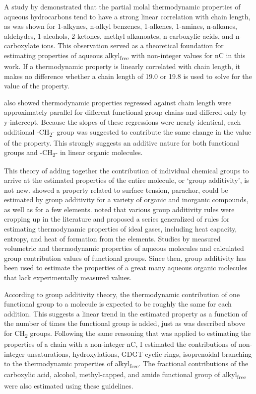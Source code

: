 A study by \cite{shock1990calculation} demonstrated that the partial molal thermodynamic properties of aqueous hydrocarbons tend to have a strong linear correlation with chain length, as was shown for 1-alkynes, n-alkyl benzenes, 1-alkenes, 1-amines, n-alkanes, aldehydes, 1-alcohols, 2-ketones, methyl alkanoates, n-carboxylic acids, and n-carboxylate ions. This observation served as a theoretical foundation for estimating properties of aqueous alkyl\textsubscript{free} with non-integer values for nC in this work. If a thermodynamic property is linearly correlated with chain length, it makes no difference whether a chain length of 19.0 or 19.8 is used to solve for the value of the property.

\cite{shock1990calculation} also showed thermodynamic properties regressed against chain length were approximately parallel for different functional group chains and differed only by y-intercept. Because the slopes of these regressions were nearly identical, each additional -CH\textsubscript{2}- group was suggested to contribute the same change in the value of the property. This strongly suggests an additive nature for both functional groups and -CH\textsubscript{2}- in linear organic molecules.

This theory of adding together the contribution of individual chemical groups to arrive at the estimated properties of the entire molecule, or `group additivity', is not new. \cite{sugden1924cxlii} showed a property related to surface tension, parachor, could be estimated by group additivity for a variety of organic and inorganic compounds, as well as for a few elements. \cite{benson1958additivity} noted that various group additivity rules were cropping up in the literature and proposed a series generalized of rules for estimating thermodynamic properties of ideal gases, including heat capacity, entropy, and heat of formation from the elements. Studies by \cite{cabani1981group, cabani1977volume2, cabani1977volume1} measured volumetric and thermodynamic properties of aqueous molecules and calculated group contribution values of functional groups. Since then, group additivity has been used to estimate the properties of a great many aqueous organic molecules that lack experimentally measured values.

According to group additivity theory, the thermodynamic contribution of one functional group to a molecule is expected to be roughly the same for each addition. This suggests a linear trend in the estimated property as a function of the number of times the functional group is added, just as was described above for CH\textsubscript{2} groups. Following the same reasoning that was applied to estimating the properties of a chain with a non-integer nC, I estimated the contributions of non-integer unsaturations, hydroxylations, GDGT cyclic rings, isoprenoidal branching to the thermodynamic properties of alkyl\textsubscript{free}. The fractional contributions of the carboxylic acid, alcohol, methyl-capped, and amide functional group of alkyl\textsubscript{free} were also estimated using these guidelines.

